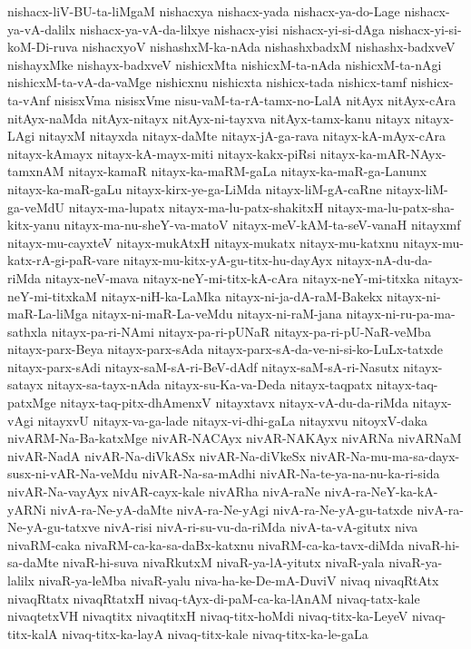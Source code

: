 {nishacx-liV-BU-ta-liMgaM
nishacxya
nishacx-yada
nishacx-ya-do-Lage
nishacx-ya-vA-dalilx
nishacx-ya-vA-da-lilxye
nishacx-yisi
nishacx-yi-si-dAga
nishacx-yi-si-koM-Di-ruva
nishacxyoV
nishashxM-ka-nAda
nishashxbadxM
nishashx-badxveV
nishayxMke
nishayx-badxveV
nishicxMta
nishicxM-ta-nAda
nishicxM-ta-nAgi
nishicxM-ta-vA-da-vaMge
nishicxnu
nishicxta
nishicx-tada
nishicx-tamf
nishicx-ta-vAnf
nisisxVma
nisisxVme
nisu-vaM-ta-rA-tamx-no-LalA
nitAyx
nitAyx-cAra
nitAyx-naMda
nitAyx-nitayx
nitAyx-ni-tayxva
nitAyx-tamx-kanu
nitayx
nitayx-LAgi
nitayxM
nitayxda
nitayx-daMte
nitayx-jA-ga-rava
nitayx-kA-mAyx-cAra
nitayx-kAmayx
nitayx-kA-mayx-miti
nitayx-kakx-piRsi
nitayx-ka-mAR-NAyx-tamxnAM
nitayx-kamaR
nitayx-ka-maRM-gaLa
nitayx-ka-maR-ga-Lanunx
nitayx-ka-maR-gaLu
nitayx-kirx-ye-ga-LiMda
nitayx-liM-gA-caRne
nitayx-liM-ga-veMdU
nitayx-ma-lupatx
nitayx-ma-lu-patx-shakitxH
nitayx-ma-lu-patx-sha-kitx-yanu
nitayx-ma-nu-sheY-va-matoV
nitayx-meV-kAM-ta-seV-vanaH
nitayxmf
nitayx-mu-cayxteV
nitayx-mukAtxH
nitayx-mukatx
nitayx-mu-katxnu
nitayx-mu-katx-rA-gi-paR-vare
nitayx-mu-kitx-yA-gu-titx-hu-dayAyx
nitayx-nA-du-da-riMda
nitayx-neV-mava
nitayx-neY-mi-titx-kA-cAra
nitayx-neY-mi-titxka
nitayx-neY-mi-titxkaM
nitayx-niH-ka-LaMka
nitayx-ni-ja-dA-raM-Bakekx
nitayx-ni-maR-La-liMga
nitayx-ni-maR-La-veMdu
nitayx-ni-raM-jana
nitayx-ni-ru-pa-ma-sathxla
nitayx-pa-ri-NAmi
nitayx-pa-ri-pUNaR
nitayx-pa-ri-pU-NaR-veMba
nitayx-parx-Beya
nitayx-parx-sAda
nitayx-parx-sA-da-ve-ni-si-ko-LuLx-tatxde
nitayx-parx-sAdi
nitayx-saM-sA-ri-BeV-dAdf
nitayx-saM-sA-ri-Nasutx
nitayx-satayx
nitayx-sa-tayx-nAda
nitayx-su-Ka-va-Deda
nitayx-taqpatx
nitayx-taq-patxMge
nitayx-taq-pitx-dhAmenxV
nitayxtavx
nitayx-vA-du-da-riMda
nitayx-vAgi
nitayxvU
nitayx-va-ga-lade
nitayx-vi-dhi-gaLa
nitayxvu
nitoyxV-daka
nivARM-Na-Ba-katxMge
nivAR-NACAyx
nivAR-NAKAyx
nivARNa
nivARNaM
nivAR-NadA
nivAR-Na-diVkASx
nivAR-Na-diVkeSx
nivAR-Na-mu-ma-sa-dayx-susx-ni-vAR-Na-veMdu
nivAR-Na-sa-mAdhi
nivAR-Na-te-ya-na-nu-ka-ri-sida
nivAR-Na-vayAyx
nivAR-cayx-kale
nivARha
nivA-raNe
nivA-ra-NeY-ka-kA-yARNi
nivA-ra-Ne-yA-daMte
nivA-ra-Ne-yAgi
nivA-ra-Ne-yA-gu-tatxde
nivA-ra-Ne-yA-gu-tatxve
nivA-risi
nivA-ri-su-vu-da-riMda
nivA-ta-vA-gitutx
niva
nivaRM-caka
nivaRM-ca-ka-sa-daBx-katxnu
nivaRM-ca-ka-tavx-diMda
nivaR-hi-sa-daMte
nivaR-hi-suva
nivaRkutxM
nivaR-ya-lA-yitutx
nivaR-yala
nivaR-ya-lalilx
nivaR-ya-leMba
nivaR-yalu
niva-ha-ke-De-mA-DuviV
nivaq
nivaqRtAtx
nivaqRtatx
nivaqRtatxH
nivaq-tAyx-di-paM-ca-ka-lAnAM
nivaq-tatx-kale
nivaqtetxVH
nivaqtitx
nivaqtitxH
nivaq-titx-hoMdi
nivaq-titx-ka-LeyeV
nivaq-titx-kalA
nivaq-titx-ka-layA
nivaq-titx-kale
nivaq-titx-ka-le-gaLa
}
